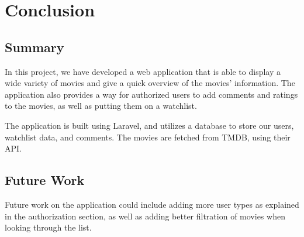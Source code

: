 \section{Conclusion}

\subsection{Summary}
In this project, we have developed a web application
that is able to display a wide variety of movies and give a quick overview of the movies' information. 
The application also provides a way for authorized users to add comments and ratings to the movies, 
as well as putting them on a watchlist.\newline

The application is built using Laravel, and utilizes a database to store our users, 
watchlist data, and comments. The movies are fetched from TMDB, using their API. \newline

\subsection{Future Work}
Future work on the application could include adding more user types as explained in the authorization section, 
as well as adding better filtration of movies when looking through the list. \newline